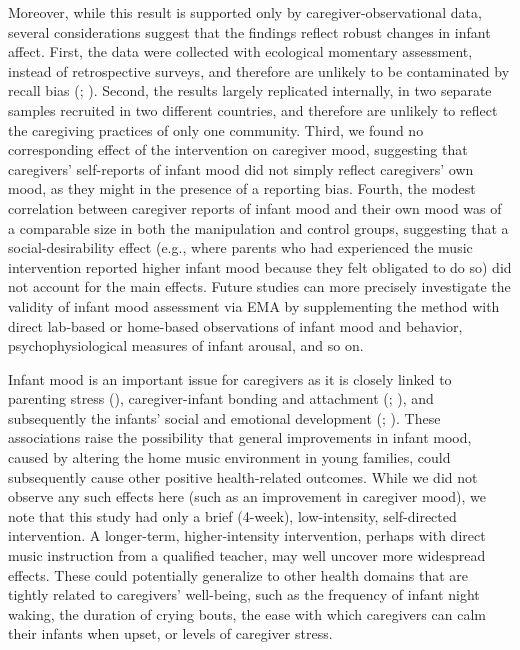 \documentclass[
]{article}
\begin{document}
Moreover, while this result is supported only by caregiver-observational
data, several considerations suggest that the findings reflect robust
changes in infant affect. First, the data were collected with ecological
momentary assessment, instead of retrospective surveys, and therefore
are unlikely to be contaminated by recall bias
(;
). Second, the results largely
replicated internally, in two separate samples recruited in two
different countries, and therefore are unlikely to reflect the
caregiving practices of only one community. Third, we found no
corresponding effect of the intervention on caregiver mood, suggesting
that caregivers' self-reports of infant mood did not simply reflect
caregivers' own mood, as they might in the presence of a reporting bias.
Fourth, the modest correlation between caregiver reports of infant mood
and their own mood was of a comparable size in both the manipulation and
control groups, suggesting that a social-desirability effect (e.g.,
where parents who had experienced the music intervention reported higher
infant mood because they felt obligated to do so) did not account for
the main effects. Future studies can more precisely investigate the
validity of infant mood assessment via EMA by supplementing the method
with direct lab-based or home-based observations of infant mood and
behavior, psychophysiological measures of infant arousal, and so on.

Infant mood is an important issue for caregivers as it is closely linked
to parenting stress (),
caregiver-infant bonding and attachment (; ), and
subsequently the infants' social and emotional development
(;
). These associations raise
the possibility that general improvements in infant mood, caused by
altering the home music environment in young families, could
subsequently cause other positive health-related outcomes. While we did
not observe any such effects here (such as an improvement in caregiver
mood), we note that this study had only a brief (4-week), low-intensity,
self-directed intervention. A longer-term, higher-intensity
intervention, perhaps with direct music instruction from a qualified
teacher, may well uncover more widespread effects. These could
potentially generalize to other health domains that are tightly related
to caregivers' well-being, such as the frequency of infant night waking,
the duration of crying bouts, the ease with which caregivers can calm
their infants when upset, or levels of caregiver stress.
\end{document}
